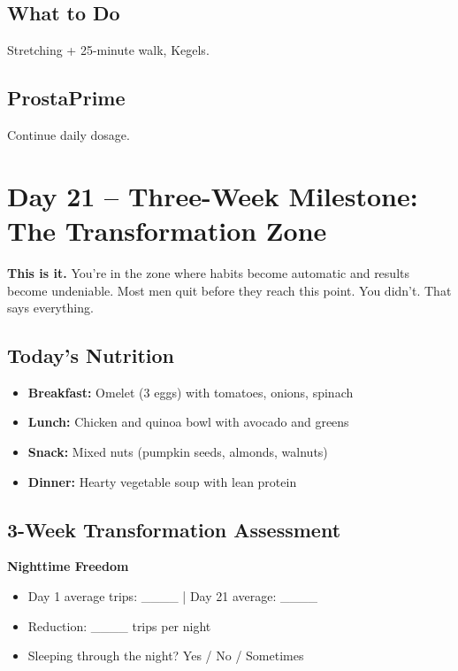 \documentclass[11pt,oneside]{book}
\begin{document}
\section*{What to Do}
Stretching + 25-minute walk, Kegels.

\section*{ProstaPrime}
Continue daily dosage.

\clearpage


\chapter*{Day 21 – Three-Week Milestone: The Transformation Zone}

\textbf{This is it.} You're in the zone where habits become automatic and results become undeniable. Most men quit before they reach this point. You didn't. That says everything.

\section*{Today's Nutrition}
\begin{itemize}[leftmargin=*]
\item \textbf{Breakfast:} Omelet (3 eggs) with tomatoes, onions, spinach
\item \textbf{Lunch:} Chicken and quinoa bowl with avocado and greens
\item \textbf{Snack:} Mixed nuts (pumpkin seeds, almonds, walnuts)
\item \textbf{Dinner:} Hearty vegetable soup with lean protein
\end{itemize}

\section*{3-Week Transformation Assessment}

\textbf{Nighttime Freedom}
\begin{itemize}[leftmargin=*]
\item Day 1 average trips: \_\_\_\_ | Day 21 average: \_\_\_\_
\item Reduction: \_\_\_\_ trips per night
\item Sleeping through the night? Yes / No / Sometimes
\end{itemize}
\end{document}
